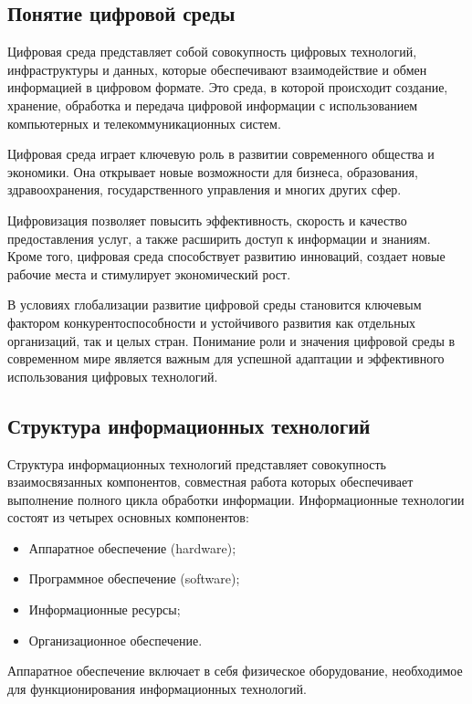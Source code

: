 \documentclass{ou}
\begin{document}
\subsection{Понятие цифровой среды}
Цифровая среда представляет собой совокупность цифровых технологий, инфраструктуры и данных, которые обеспечивают взаимодействие и обмен информацией в цифровом формате. Это среда, в которой происходит создание, хранение, обработка и передача цифровой информации с использованием компьютерных и телекоммуникационных систем\cite{skyeng}.

Цифровая среда играет ключевую роль в развитии современного общества и экономики. Она открывает новые возможности для бизнеса, образования, здравоохранения, государственного управления и многих других сфер.

Цифровизация позволяет повысить эффективность, скорость и качество предоставления услуг, а также расширить доступ к информации и знаниям. Кроме того, цифровая среда способствует развитию инноваций, создает новые рабочие места и стимулирует экономический рост\cite{sviazexpo}.

В условиях глобализации развитие цифровой среды становится ключевым фактором конкурентоспособности и устойчивого развития как отдельных организаций, так и целых стран. Понимание роли и значения цифровой среды в современном мире является важным для успешной адаптации и эффективного использования цифровых технологий\cite{Cspo}.
\subsection{Структура информационных технологий}
Структура информационных технологий представляет совокупность взаимосвязанных компонентов, совместная работа которых обеспечивает выполнение полного цикла обработки информации. Информационные технологии состоят из четырех основных компонентов: 
\begin{itemize}[label=-, leftmargin=0em, itemindent=3.35em, nosep]
\item Аппаратное обеспечение (hardware);
\item Программное обеспечение (software);
\item Информационные ресурсы;
\item Организационное обеспечение\cite{Portal.tpu}.
\end{itemize}

Аппаратное обеспечение включает в себя физическое оборудование, необходимое для функционирования информационных технологий.
\end{document}
